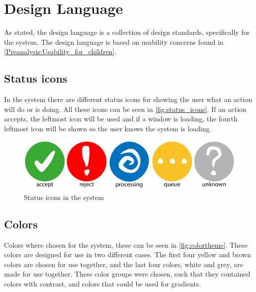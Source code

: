 \section{Design Language}
\label{design:design_language}
As stated, the design language is a collection of design standards, specifically for the \giraf[] system. 
The design language is based on usability concerns found in \autoref{Preanalysis:Usability_for_children}.

\subsection*{Status icons}
\label{design:state_icons}

In the \giraf[] system there are different status icons for showing the user what an action will do or is doing. All these icons can be seen in \autoref{fig:status_icons}. If an action accepts, the leftmost icon will be used and if a window is loading, the fourth leftmost icon will be shown so the user knows the system is loading.

\begin{figure}[h!]
	\centering
	\includegraphics[width=\textwidth]{gfx/status_icons}
	\caption{Status icons in the \giraf[] system}
	\label{fig:status_icons}
\end{figure}

\subsection*{Colors}
\label{design:giraf_colors}


Colors where chosen for the \giraf[] system, these can be seen in \autoref{fig:colortheme}. These colors are designed for use in two different cases. The first four yellow and brown colors are chosen for use together, and the last four colors, white and grey, are made for use together. 
These color groups were chosen, such that they contained colors with contrast, and colors that could be used for gradients.

